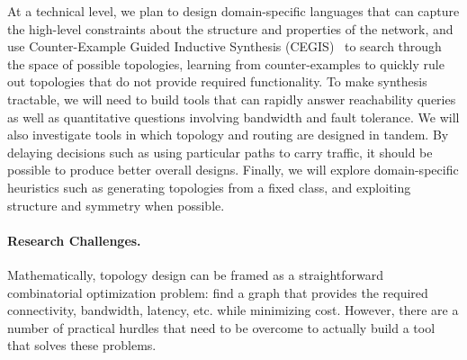 At a technical level, we plan to design domain-specific languages that
can capture the high-level constraints about the structure and
properties of the network, and use Counter-Example Guided Inductive
Synthesis (CEGIS)~\cite{sketch} to search through the space of possible topologies,
learning from counter-examples to quickly rule out topologies that do
not provide required functionality. To make synthesis tractable, we
will need to build tools that can rapidly answer reachability queries
as well as quantitative questions involving bandwidth and fault
tolerance. We will also investigate tools in which topology and
routing are designed in tandem. By delaying decisions such as using
particular paths to carry traffic, it should be possible to produce
better overall designs. Finally, we will explore domain-specific
heuristics such as generating topologies from a fixed class, and
exploiting structure and symmetry when possible.

\paragraph*{Research Challenges.}
%
Mathematically, topology design can be framed as a straightforward
combinatorial optimization problem: find a graph that provides the
required connectivity, bandwidth, latency, etc. while minimizing
cost. However, there are a number of practical hurdles that need to be
overcome to actually build a tool that solves these problems.

